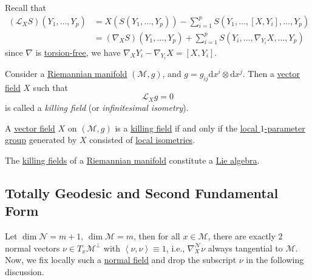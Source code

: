 \begin{prev}
	Recall that
	\[
		\begin{split}
			(\mathcal{L} _X S) (Y_1, \dots , Y_p)
			&=X(S(Y_1, \dots , Y_p))
			- \sum_{i=1}^{p} S(Y_1, \dots , [X, Y_i], \dots , Y_p)\\
			&= (\nabla _X S)(Y_1, \dots , Y_p) + \sum_{i=1}^{p} S(Y_i, \dots , \nabla _{Y_i}X, \dots , Y_p)
		\end{split}
	\]
	since \(\nabla \) is \hyperref[def:torsion-free]{torsion-free}, we have \(\nabla _X Y_i - \nabla _{Y_i}X = [X, Y_i]\).
\end{prev}

\begin{definition}\label{def:killing-field}
	Consider a \hyperref[def:Riemannian-manifold]{Riemannian manifold} \((\mathcal{M} , g)\), and \(g = g_{ij} \mathrm{d} x^i \otimes \mathrm{d} x^j \). Then a \hyperref[def:vector-field]{vector field} \(X\) such that
	\[
		\mathcal{L} _X g = 0
	\]
	is called a \emph{killing field} (or \emph{infinitesimal isometry}).
\end{definition}

\begin{lemma}
	A \hyperref[def:vector-field]{vector field} \(X\) on \((\mathcal{M} , g)\) is a \hyperref[def:killing-field]{killing field} if and only if the \hyperref[def:local-1-parameter-group]{local \(1\)-parameter group} generated by \(X\) consisted of \hyperref[def:local-isometry]{local isometries}.
\end{lemma}

\begin{lemma}
	The \hyperref[def:killing-field]{killing fields} of a \hyperref[def:Riemannian-manifold]{Riemannian manifold} constitute a \hyperref[def:Lie-algebra]{Lie algebra}.
\end{lemma}

\subsection{Totally Geodesic and Second Fundamental Form}
Let \(\dim \mathcal{N} = m+1\), \(\dim \mathcal{M} = m\), then for all \(x\in \mathcal{M} \), there are exactly \(2\) normal vectors \(\nu \in T_x \mathcal{M} ^{\perp} \) with \(\left\langle \nu, \nu \right\rangle \equiv 1\), i.e., \(\nabla _X^{\mathcal{N} } \nu \) always tangential to \(\mathcal{M} \). Now, we fix locally such a \hyperref[not:normal-bundle]{normal field} and drop the subscript \(\nu \) in the following discussion.

